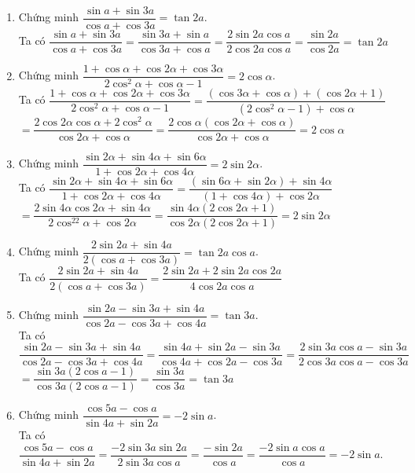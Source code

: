 \begin{bt}
{\begin{enumerate}
			\item Chứng minh $\dfrac{\sin a+\sin 3a}{\cos a+\cos 3a}=\tan 2a$. \\
			Ta có $\dfrac{\sin a+\sin 3a}{\cos a+\cos 3a}=\dfrac{\sin 3a+\sin a}{\cos 3a+\cos a}=\dfrac{2\sin 2a\cos a}{2\cos 2a\cos a}=\dfrac{\sin 2a}{\cos 2a}=\tan 2a$
			\item Chứng minh $\dfrac{1+\cos \alpha +\cos 2\alpha +\cos 3\alpha}{2\cos^2\alpha +\cos \alpha -1}=2\cos \alpha $. \\
			Ta có $\dfrac{1+\cos \alpha +\cos 2\alpha +\cos 3\alpha}{2\cos^2\alpha +\cos \alpha -1}=\dfrac{\left(\cos 3\alpha +\cos \alpha \right)+\left(\cos 2\alpha +1\right)}{\left(2\cos^2\alpha -1\right)+\cos \alpha}$ \\
			$=\dfrac{2\cos 2\alpha \cos \alpha +2\cos^2\alpha}{\cos 2\alpha +\cos \alpha}=\dfrac{2\cos \alpha \left(\cos 2\alpha +\cos \alpha \right)}{\cos 2\alpha +\cos \alpha}=2\cos \alpha $
			\item Chứng minh $\dfrac{\sin 2\alpha +\sin 4\alpha +\sin 6\alpha}{1+\cos 2\alpha +\cos 4\alpha}=2\sin 2\alpha $. \\
			Ta có $\dfrac{\sin 2\alpha +\sin 4\alpha +\sin 6\alpha}{1+\cos 2\alpha +\cos 4\alpha}=\dfrac{\left(\sin 6\alpha +\sin 2\alpha \right)+\sin 4\alpha}{\left(1+\cos 4\alpha \right)+\cos 2\alpha}$ \\
			$=\dfrac{2\sin 4\alpha \cos 2\alpha +\sin 4\alpha}{2\cos^22\alpha +\cos 2\alpha}=\dfrac{\sin 4\alpha \left(2\cos 2\alpha +1\right)}{\cos 2\alpha \left(2\cos 2\alpha +1\right)}=2\sin 2\alpha $
			\item Chứng minh $\dfrac{2\sin 2a+\sin 4a}{2(\cos a+\cos 3a)}=\tan 2a\cos a$. \\
			Ta có $\dfrac{2\sin 2a+\sin 4a}{2(\cos a+\cos 3a)}=\dfrac{2\sin 2a+2\sin 2a\cos 2a}{4\cos 2a\cos a}$
			\item Chứng minh $\dfrac{\sin 2a-\sin 3a+\sin 4a}{\cos 2a-\cos 3a+\cos 4a}=\tan 3a$. \\
			Ta có $\dfrac{\sin 2a-\sin 3a+\sin 4a}{\cos 2a-\cos 3a+\cos 4a}=\dfrac{\sin 4a+\sin 2a-\sin 3a}{\cos 4a+\cos 2a-\cos 3a}=\dfrac{2\sin 3a\cos a-\sin 3a}{2\cos 3a\cos a-\cos 3a}$ \\
			$=\dfrac{\sin 3a\left(2\cos a-1\right)}{\cos 3a\left(2\cos a-1\right)}=\dfrac{\sin 3a}{\cos 3a}=\tan 3a$
			\item Chứng minh $\dfrac{\cos 5a-\cos a}{\sin 4a+\sin 2a}=-2\sin a$. \\
			Ta có $\dfrac{\cos 5a-\cos a}{\sin 4a+\sin 2a}=\dfrac{-2\sin 3a\sin 2a}{2\sin 3a\cos a}=\dfrac{-\sin 2a}{\cos a}=\dfrac{-2\sin a\cos a}{\cos a}=-2\sin a$.

\end{enumerate}}
\end{bt}
